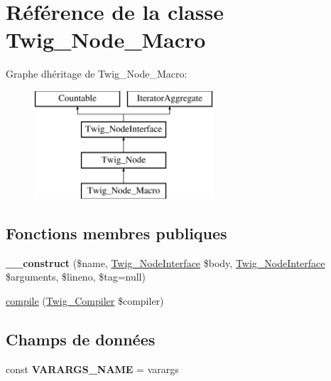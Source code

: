 \hypertarget{class_twig___node___macro}{}\section{Référence de la classe Twig\+\_\+\+Node\+\_\+\+Macro}
\label{class_twig___node___macro}
Graphe d\textquotesingle{}héritage de Twig\+\_\+\+Node\+\_\+\+Macro\+:\begin{figure}[H]
\begin{center}
\leavevmode
\includegraphics[height=4.000000cm]{class_twig___node___macro}
\end{center}
\end{figure}
\subsection*{Fonctions membres publiques}
\begin{DoxyCompactItemize}
\item 
{\bfseries \+\_\+\+\_\+construct} (\$name, \hyperlink{interface_twig___node_interface}{Twig\+\_\+\+Node\+Interface} \$body, \hyperlink{interface_twig___node_interface}{Twig\+\_\+\+Node\+Interface} \$arguments, \$lineno, \$tag=null)\hypertarget{class_twig___node___macro_aba8a39ec362204a258fe9be110054fba}{}\label{class_twig___node___macro_aba8a39ec362204a258fe9be110054fba}

\item 
\hyperlink{class_twig___node___macro_a4e0faa87c3fae583620b84d3607085da}{compile} (\hyperlink{class_twig___compiler}{Twig\+\_\+\+Compiler} \$compiler)
\end{DoxyCompactItemize}
\subsection*{Champs de données}
\begin{DoxyCompactItemize}
\item 
const {\bfseries V\+A\+R\+A\+R\+G\+S\+\_\+\+N\+A\+ME} = \textquotesingle{}varargs\textquotesingle{}\hypertarget{class_twig___node___macro_a72e057ce5ef00db984eac28e66a67776}{}\label{class_twig___node___macro_a72e057ce5ef00db984eac28e66a67776}

\end{DoxyCompactItemize}
